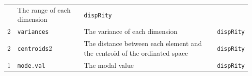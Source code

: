 \documentclass[]{book}
\theoremstyle{definition}
\theoremstyle{definition}
\theoremstyle{remark}
\begin{document}
\begin{longtable}[]{@{}llll@{}}
\begin{minipage}[t]{0.08\columnwidth}
\end{minipage} & \begin{minipage}[t]{0.61\columnwidth}\raggedright\strut
The range of each dimension\strut
\end{minipage} & \begin{minipage}[t]{0.11\columnwidth}\raggedright\strut
\texttt{dispRity}\strut
\end{minipage}\tabularnewline
\begin{minipage}[t]{0.08\columnwidth}\raggedright\strut
2\strut
\end{minipage} & \begin{minipage}[t]{0.08\columnwidth}\raggedright\strut
\texttt{variances}\strut
\end{minipage} & \begin{minipage}[t]{0.61\columnwidth}\raggedright\strut
The variance of each dimension\strut
\end{minipage} & \begin{minipage}[t]{0.11\columnwidth}\raggedright\strut
\texttt{dispRity}\strut
\end{minipage}\tabularnewline
\begin{minipage}[t]{0.08\columnwidth}\raggedright\strut
2\strut
\end{minipage} & \begin{minipage}[t]{0.08\columnwidth}\raggedright\strut
\texttt{centroids}2\strut
\end{minipage} & \begin{minipage}[t]{0.61\columnwidth}\raggedright\strut
The distance between each element and the centroid of the ordinated
space\strut
\end{minipage} & \begin{minipage}[t]{0.11\columnwidth}\raggedright\strut
\texttt{dispRity}\strut
\end{minipage}\tabularnewline
\begin{minipage}[t]{0.08\columnwidth}\raggedright\strut
1\strut
\end{minipage} & \begin{minipage}[t]{0.08\columnwidth}\raggedright\strut
\texttt{mode.val}\strut
\end{minipage} & \begin{minipage}[t]{0.61\columnwidth}\raggedright\strut
The modal value\strut
\end{minipage} & \begin{minipage}[t]{0.11\columnwidth}\raggedright\strut
\texttt{dispRity}\strut
\end{minipage}\tabularnewline
\bottomrule
\end{longtable}
\end{document}
